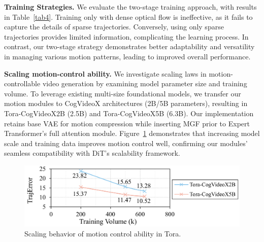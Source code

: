 \noindent \textbf{Training Strategies.} We evaluate the two-stage training approach, with results in Table~\ref{tab4}. Training only with dense optical flow is ineffective, as it fails to capture the details of sparse trajectories. Conversely, using only sparse trajectories provides limited information, complicating the learning process. In contrast, our two-stage strategy demonstrates better adaptability and versatility in managing various motion patterns, leading to improved overall performance.







\noindent \textbf{Scaling motion-control ability.} We investigate scaling laws in motion-controllable video generation by examining model parameter size and training volume. To leverage existing multi-size foundational models, we transfer our motion modules to CogVideoX architectures (2B/5B parameters), resulting in Tora-CogVideoX2B (2.5B) and Tora-CogVideoX5B (6.3B). Our implementation retains base VAE for motion compression while inserting MGF prior to Expert Transformer's full attention module. Figure~\ref{f1} demonstrates that increasing model scale and training data improves motion control well, confirming our modules' seamless compatibility with DiT's scalability framework.

\begin{figure}[!t]
    \centering
    \includegraphics[width=1\linewidth]{images/reb-f1.pdf}
    \caption{Scaling behavior of motion control ability in Tora.}
    \label{f1}
    \vspace{-4mm}
\end{figure}
